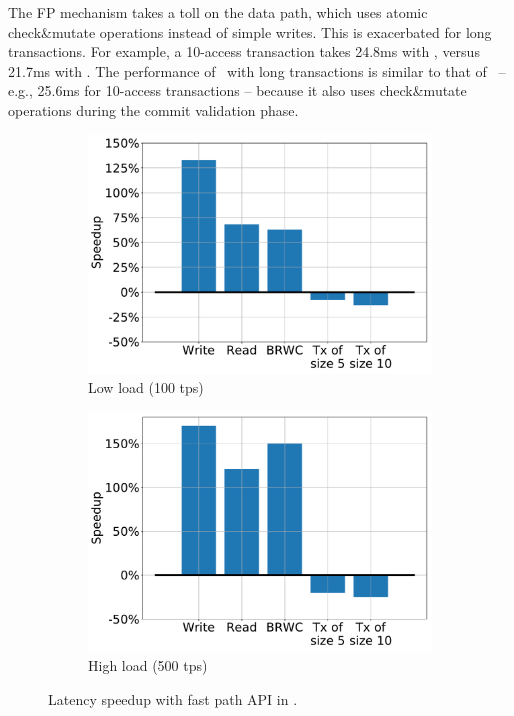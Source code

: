 The FP mechanism takes a toll on the data path, which uses atomic check\&mutate operations 
instead of simple writes. This is exacerbated for long transactions.
For example, a 10-access transaction takes 24.8ms with \sys, 
versus 21.7ms with  \sysll. The performance of \syspc\ with long transactions is similar to that of \sys\ -- e.g., 25.6ms for 10-access transactions -- 
because it also uses check\&mutate operations during the commit validation phase.

 

\begin{figure}
\centering
\begin{subfigure}[t]{0.35\textwidth}
\centerline{
\includegraphics[width=.85\textwidth]{figs/low_speedup.pdf}
}
\caption{\small Low load (100 tps)} 
\label{fig:slowdown-low}
\end{subfigure} 
\begin{subfigure}[t]{0.35\textwidth}
\centerline{
\includegraphics[width=.85\textwidth]{figs/high_speedup.pdf}
}
\caption{\small High load (500 tps)} 
\label{fig:slowdown-high}
\end{subfigure} 
\vspace{-0.3cm}
\caption{\small Latency speedup with  fast path API in {\sys}.}
\vspace{-0.7cm}
\label{fig:fp-tradeoff}
\end{figure}



